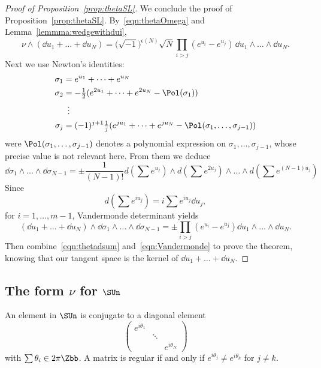\begin{proof}[Proof of Proposition~\ref{prop:thetaSL}]
We conclude the proof of Proposition~\ref{prop:thetaSL}. By~\eqref{eqn:thetaOmega} and Lemma~\ref{lemmma:wedgewithdui},
\begin{equation}\label{eqn:thetadsum}
\nu\wedge (\dd u_1+\dots + \dd u_N)= \big(\sqrt{-1}\big)^{\epsilon(N)}\sqrt{N} \prod_{i> j}(e^{u_i}-e^{u_j})\, \dd u_1\wedge \dots \wedge \dd u_N.
\end{equation}
Next we use Newton's identities:
\begin{align*}
\sigma_1 & = e^{u_1}+ \dots + e^{u_N} \\
\sigma_2 & = -\tfrac{1}{2} (e^{2 u_1}+ \dots + e^{2 u_N} -\Pol(\sigma_1)) \\
&\;\:\vdots \\
\sigma_j & = (-1)^{j+1}\tfrac{1}{j} (e^{j u_1}+ \dots + e^{j u_N} -\Pol(\sigma_1,\dots,\sigma_{j-1}))
\end{align*}
were $ \Pol(\sigma_1,\dots,\sigma_{j-1})$ denotes a polynomial expression on $\sigma_1,\dots,\sigma_{j-1}$, whose precise value is not relevant here. From them we deduce
\[
\dd\sigma_1\wedge\dots\wedge \dd\sigma_{N-1}= \pm \frac{1}{(N-1)!}d (\sum e^{u_j}) \wedge d (\sum e^{2 u_j})\wedge \dots
\wedge d (\sum e^{(N-1)u_j})
\]
Since
\[
d (\sum e^{i u_j}) = i \sum e^{i u_j}\dd u_ j,
\]
for $i=1,\dots, m-1$, Vandermonde determinant yields
\begin{equation}\label{eqn:Vandermonde}
(\dd u_1+\dots + \dd u_N) \wedge \dd\sigma_1\wedge\dots\wedge \dd\sigma_{N-1} =
\pm \prod_{i>j} (e^{u_i}-e^{u_j}) \dd u_1\wedge \dots \wedge \dd u_N.
\end{equation}
Then combine~\eqref{eqn:thetadsum} and~\eqref{eqn:Vandermonde} to prove the theorem, knowing that our tangent space is the kernel of $ \dd u_1+\dots + \dd u_N $.
\end{proof}


\subsection{The form \texorpdfstring{$\nu$}{nu} for \texorpdfstring{$\SUn$}{SUn}}

An element in $\SUn$ is conjugate to a diagonal element
\[
\begin{pmatrix}
e^{i\theta_1} & & \\
& \ddots & \\
& & e^{i\theta_N}
\end{pmatrix}
\]
with $\sum\theta_i\in 2\pi\Zbb$. A matrix is regular if and only if $e^{i\theta_j}\neq e^{i\theta_k}$ for $j\neq k$.

